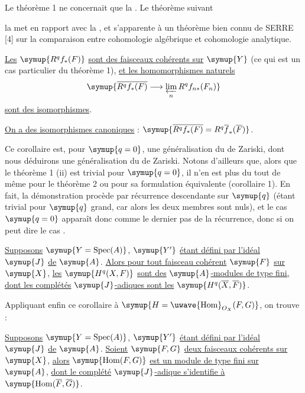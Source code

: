 Le théorème 1 ne concernait que la . Le théorème suivant

la met en rapport avec la , et s'apparente à un
théorème bien connu de SERRE [4] sur la comparaison entre cohomologie algébrique
et cohomologie analytique.

 \uline{Les}
$\symup{R^{q}f_{*}(F)}$ \uline{sont des faisceaux cohérents sur} $\symup{Y}$ (ce qui est un cas
particulier du théorème 1), \uline{et les homomorphismes naturels}
\[
  \symup{\overline{R^{q}f_{*}(F)}
  \longrightarrow \varprojlim\limits_n R^{q}f_{n*}(F_n)}
\]
\uline{sont des isomorphismes}.

 \uline{On a des isomorphismes canoniques} :
$\symup{\overline{R^{q}f_{*}(F)}=R^{q}\overline f_{*}(\overline F)}$.

Ce corollaire est, pour $\symup{q=0}$, une généralisation du  de Zariski, dont nous déduirons une généralisation du
 de Zariski. Notons d'ailleurs que, alors que le
théorème 1 (ii) est trivial pour $\symup{q=0}$, il n'en est plus du tout de
même pour le théorème 2 ou pour sa formulation équivalente (corollaire 1). En
fait, la démonstration procède par récurrence descendante sur $\symup{q}$ (étant
trivial pour $\symup{q}$ grand, car alors les deux membres sont nuls), et le cas $\symup{q=0}$
apparaît donc comme le dernier pas de la récurrence, donc si on peut dire le cas
.

 \uline{Supposons} $\symup{Y=\operatorname{Spec}(A)}$, $\symup{Y'}$ \uline{étant défini
par l'idéal} $\symup{J}$ \uline{de} $\symup{A}$. \uline{Alors pour tout faisceau cohérent} $\symup{F}$ \uline{sur} $\symup{X}$, \uline{les}
$\symup{H^{q}(X,F)}$ \uline{sont des} $\symup{A}$\uline{-modules de type fini, dont les complétés} $\symup{J}$\uline{-adiques
sont les} $\symup{H^{q}(\overline X,\overline F)}$.

Appliquant enfin ce corollaire à
$\symup{H=\mathop{\text{\uwave{Hom}}}\nolimits_{O_X}(F,G)}$, on trouve :

 \uline{Supposons} $\symup{Y=\operatorname{Spec}(A)}$, $\symup{Y'}$ \uline{étant défini
par l'idéal} $\symup{J}$ \uline{de} $\symup{A}$. \uline{Soient} $\symup{F,G}$ \uline{deux faisceaux cohérents sur} $\symup{X}$, \uline{alors}
$\symup{\operatorname{Hom}(F,G)}$ \uline{est un module de type fini sur} $\symup{A}$, \uline{dont le complété}
$\symup{J}$\uline{-adique s'identifie à}
$\symup{\operatorname{Hom}(\overline F,\overline G)}$.

